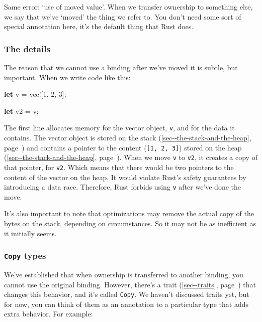 \documentclass[a4paper,]{book}
\renewcommand*{\hyperref}[2][\ar]{%
  \def\ar{#2}%
  #2 (\autoref{#1}, page~\pageref{#1})}
\newenvironment{Shaded}{\begin{snugshade}}{\end{snugshade}}
\newcommand{\KeywordTok}[1]{\textcolor[rgb]{0.13,0.29,0.53}{\textbf{{#1}}}}
\newcommand{\DecValTok}[1]{\textcolor[rgb]{0.00,0.00,0.81}{{#1}}}
\newcommand{\OtherTok}[1]{\textcolor[rgb]{0.56,0.35,0.01}{{#1}}}
\newcommand{\NormalTok}[1]{{#1}}
\begin{document}
Same error: `use of moved value'. When we transfer ownership to
something else, we say that we've `moved' the thing we refer to. You
don't need some sort of special annotation here, it's the default thing
that Rust does.

\subsubsection{The details}\label{the-details}

The reason that we cannot use a binding after we've moved it is subtle,
but important. When we write code like this:

\begin{Shaded}
\begin{Highlighting}[]
\KeywordTok{let} \NormalTok{v = }\OtherTok{vec!}\NormalTok{[}\DecValTok{1}\NormalTok{, }\DecValTok{2}\NormalTok{, }\DecValTok{3}\NormalTok{];}

\KeywordTok{let} \NormalTok{v2 = v;}
\end{Highlighting}
\end{Shaded}

The first line allocates memory for the vector object, \texttt{v}, and
for the data it contains. The vector object is stored on the
\hyperref[sec--the-stack-and-the-heap]{stack} and contains a pointer to
the content (\texttt{{[}1,\ 2,\ 3{]}}) stored on the
\hyperref[sec--the-stack-and-the-heap]{heap}. When we move \texttt{v} to
\texttt{v2}, it creates a copy of that pointer, for \texttt{v2}. Which
means that there would be two pointers to the content of the vector on
the heap. It would violate Rust's safety guarantees by introducing a
data race. Therefore, Rust forbids using \texttt{v} after we've done the
move.

It's also important to note that optimizations may remove the actual
copy of the bytes on the stack, depending on circumstances. So it may
not be as inefficient as it initially seems.

\subsubsection{\texorpdfstring{\texttt{Copy}
types}{Copy types}}\label{copy-types}

We've established that when ownership is transferred to another binding,
you cannot use the original binding. However, there's a
\hyperref[sec--traits]{trait} that changes this behavior, and it's
called \texttt{Copy}. We haven't discussed traits yet, but for now, you
can think of them as an annotation to a particular type that adds extra
behavior. For example:
\end{document}
